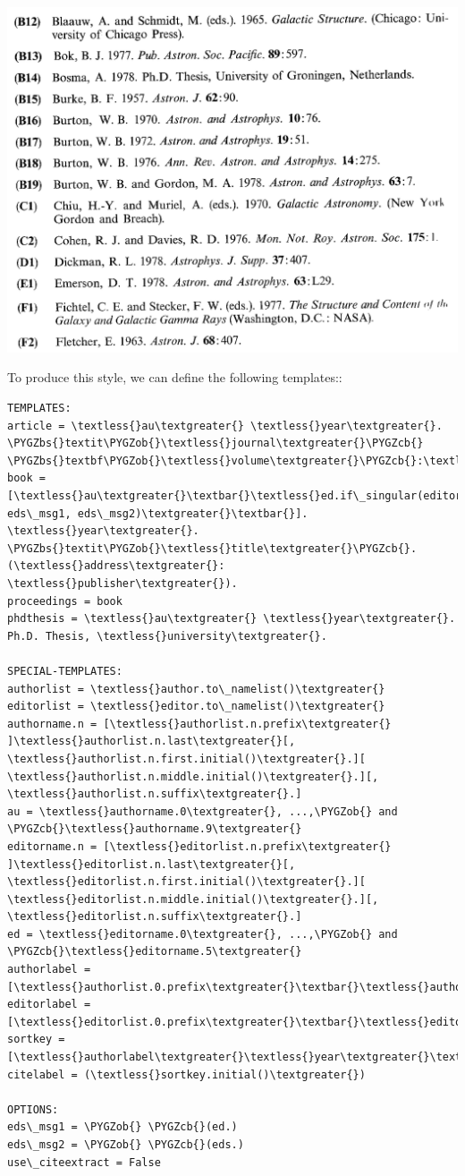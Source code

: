\documentclass[letterpaper,10pt,english]{sphinxmanual}
\def\PYGZbs{\char`\\}
\def\PYGZob{\char`\{}
\def\PYGZcb{\char`\}}
\begin{document}
\includegraphics[width=0.500\linewidth]{example2a.png}

To produce this style, we can define the following templates::

\begin{Verbatim}[commandchars=\\\{\}]
TEMPLATES:
article = \textless{}au\textgreater{} \textless{}year\textgreater{}. \PYGZbs{}textit\PYGZob{}\textless{}journal\textgreater{}\PYGZcb{} \PYGZbs{}textbf\PYGZob{}\textless{}volume\textgreater{}\PYGZcb{}:\textless{}pages\textgreater{}.
book = [\textless{}au\textgreater{}\textbar{}\textless{}ed.if\_singular(editorlist, eds\_msg1, eds\_msg2)\textgreater{}\textbar{}]. \textless{}year\textgreater{}. \PYGZbs{}textit\PYGZob{}\textless{}title\textgreater{}\PYGZcb{}. (\textless{}address\textgreater{}: \textless{}publisher\textgreater{}).
proceedings = book
phdthesis = \textless{}au\textgreater{} \textless{}year\textgreater{}. Ph.D. Thesis, \textless{}university\textgreater{}.

SPECIAL-TEMPLATES:
authorlist = \textless{}author.to\_namelist()\textgreater{}
editorlist = \textless{}editor.to\_namelist()\textgreater{}
authorname.n = [\textless{}authorlist.n.prefix\textgreater{} ]\textless{}authorlist.n.last\textgreater{}[, \textless{}authorlist.n.first.initial()\textgreater{}.][ \textless{}authorlist.n.middle.initial()\textgreater{}.][,  \textless{}authorlist.n.suffix\textgreater{}.]
au = \textless{}authorname.0\textgreater{}, ...,\PYGZob{} and \PYGZcb{}\textless{}authorname.9\textgreater{}
editorname.n = [\textless{}editorlist.n.prefix\textgreater{} ]\textless{}editorlist.n.last\textgreater{}[, \textless{}editorlist.n.first.initial()\textgreater{}.][ \textless{}editorlist.n.middle.initial()\textgreater{}.][,  \textless{}editorlist.n.suffix\textgreater{}.]
ed = \textless{}editorname.0\textgreater{}, ...,\PYGZob{} and \PYGZcb{}\textless{}editorname.5\textgreater{}
authorlabel = [\textless{}authorlist.0.prefix\textgreater{}\textbar{}\textless{}authorlist.0.last\textgreater{}]
editorlabel = [\textless{}editorlist.0.prefix\textgreater{}\textbar{}\textless{}editorlist.0.last\textgreater{}]
sortkey = [\textless{}authorlabel\textgreater{}\textless{}year\textgreater{}\textbar{}\textless{}editorlabel\textgreater{}\textless{}year\textgreater{}]
citelabel = (\textless{}sortkey.initial()\textgreater{})

OPTIONS:
eds\_msg1 = \PYGZob{} \PYGZcb{}(ed.)
eds\_msg2 = \PYGZob{} \PYGZcb{}(eds.)
use\_citeextract = False
\end{Verbatim}
\end{document}
